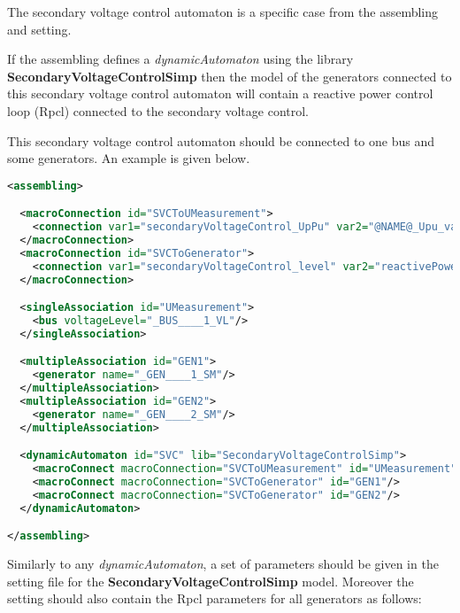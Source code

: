 \documentclass[a4paper, 12pt]{report}
\begin{document}
The secondary voltage control automaton is a specific case from the assembling and setting.

If the assembling defines a \textit{dynamicAutomaton} using the library \textbf{SecondaryVoltageControlSimp} then the model of the generators connected to
this secondary voltage control automaton will contain a reactive power control loop (Rpcl) connected to the secondary voltage control.

This secondary voltage control automaton should be connected to one bus and some generators.
An example is given below.

\begin{lstlisting}[language=XML, breaklines=true, breakatwhitespace=false, columns=fullflexible]
<assembling>

  <macroConnection id="SVCToUMeasurement">
    <connection var1="secondaryVoltageControl_UpPu" var2="@NAME@_Upu_value"/>
  </macroConnection>
  <macroConnection id="SVCToGenerator">
    <connection var1="secondaryVoltageControl_level" var2="reactivePowerControlLoop_level"/>
  </macroConnection>

  <singleAssociation id="UMeasurement">
    <bus voltageLevel="_BUS____1_VL"/>
  </singleAssociation>

  <multipleAssociation id="GEN1">
    <generator name="_GEN____1_SM"/>
  </multipleAssociation>
  <multipleAssociation id="GEN2">
    <generator name="_GEN____2_SM"/>
  </multipleAssociation>

  <dynamicAutomaton id="SVC" lib="SecondaryVoltageControlSimp">
    <macroConnect macroConnection="SVCToUMeasurement" id="UMeasurement"/>
    <macroConnect macroConnection="SVCToGenerator" id="GEN1"/>
    <macroConnect macroConnection="SVCToGenerator" id="GEN2"/>
  </dynamicAutomaton>

</assembling>
\end{lstlisting}


Similarly to any \textit{dynamicAutomaton}, a set of parameters should be given in the setting file for the \textbf{SecondaryVoltageControlSimp} model.
Moreover the setting should also contain the Rpcl parameters for all generators as follows:
\end{document}
